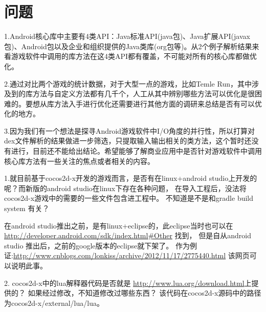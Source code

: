 \section{问题}

1.Android核心库中主要有4类API：Java标准API(java包)、Java扩展API(javax包)、Android包以及企业和组织提供的Java类库(org包等)。从2个例子解析结果来看游戏软件中调用的库方法在这4类API都有覆盖，不可能对所有的核心库都做优化。

2.通过对比两个游戏的统计数据，对于大型一点的游戏，比如Temle Run，其中涉及到的库方法与自定义方法都有几千个，人工从其中辨别哪些方法可以优化是很困难的。要想从库方法入手进行优化还需要进行其他方面的调研来总结是否有可以优化的地方。

3.因为我们有一个想法是探寻Android游戏软件中I/O角度的并行性，所以打算对dex文件解析的结果做进一步筛选，只提取输入输出相关的类方法，这个暂时还没有进行，目前还不能给出结论。希望能够了解商业应用中是否针对游戏软件中调用核心库方法有一些关注的焦点或者相关的内容。


1.就目前基于cocos2d-x开发的游戏而言，是否有在linux+android studio上开发的呢？而新版的android studio在linux下存在各种问题，
在导入工程后，没法将cocos2d-x游戏中的需要的一些文件包含进工程中。
不知道是不是和gradle build system 有关？

在android studio推出之前，是有linux+eclipse的，此eclipse当时也可以在
\url{http://developer.android.com/sdk/index.html#Other} 找到，
但是自从android studio 推出后，之前的google版本的eclipse就下架了。
作为例证:\url{http://www.cnblogs.com/lonkiss/archive/2012/11/17/2775440.html} 该网页可以说明此事。

2. cocos2d-x中的lua解释器代码是否就是
\url{http://www.lua.org/download.html}上提供的？
如果经过修改，不知道修改过哪些东西？
该代码在cocos2d-x源码中的路径为cocos2d-x/external/lua/lua。

